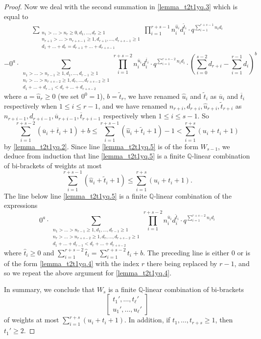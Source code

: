 \documentclass[10pt,a4paper]{amsart}
\newcommand{\Q}{ \mathbb Q }
\newcommand{\w}{\tilde}
\begin{document}
\begin{proof}
Now we deal with the second summation in \eqref{lemma_t2t1yq.3} 
which is equal to
\begin{eqnarray}  \label{lemma_t2t1yq.5}
\sum_{\substack{n_1 > \ldots > n_r \ge 0, d_1, \ldots, d_r \ge 1\\
    n_{r+1} > \ldots > n_{r+s-1} \ge 1, d_{r+1}, \ldots, d_{r+s-1} \ge 1\\
    d_1+ \ldots + d_r = d_{r+1} + \ldots + d_{r+s-1}}} 
    \prod_{i=1}^{r+s-1} n_i^{\hat u_i}d_i^{\w t_i}  
    \cdot q^{\sum_{i=1}^{r+s-1} n_i d_i}
\end{eqnarray}
$$
- 0^a \cdot 
  \sum_{\substack{n_1 > \ldots > n_{r-1} \ge 1, d_1, \ldots, d_{r-1} \ge 1\\
    n_{r} > \ldots > n_{r+s-2} \ge 1, d_{r}, \ldots, d_{r+s-2} \ge 1\\
    d_1+ \ldots + d_{r-1} < d_{r} + \ldots + d_{r+s-2}}}
    \prod_{i=1}^{r+s-2} n_i^{\overline u_i} d_i^{\overline t_i}  
    \cdot q^{\sum_{i=1}^{r+s-2} n_i d_i} \cdot  
    \left (\sum_{i=0}^{s-2} d_{r+i} - \sum_{i=1}^{r-1} d_i \right )^b
$$
where $a = \hat u_r \ge 0$ (we set $0^0 =1$), $b = \w t_r$, 
we have renamed $\hat u_i$ and $\w t_i$ as 
$\overline u_i$ and $\overline t_i$ 
respectively when $1 \le i \le r-1$, and we have renamed 
$n_{r+i}, d_{r+i}, \hat u_{r+i}, \w t_{r+i}$ as $n_{r+i-1}, d_{r+i-1}, 
\overline u_{r+i-1}, \overline t_{r+i-1}$ respectively 
when $1 \le i \le s-1$. So 
$$
    \sum_{i=1}^{r+s-2} (\overline u_i + \overline t_i + 1) + b 
\le \sum_{i=1}^{r+s-1} (\hat u_i + \w t_i + 1) - 1
< \sum_{i=1}^{r+s} (u_i + t_i + 1)
$$
by \eqref{lemma_t2t1yq.2}. Since line \eqref{lemma_t2t1yq.5} is 
of the form $W_{s-1}$, we deduce from induction that 
line \eqref{lemma_t2t1yq.5} is 
a finite $\Q$-linear combination of bi-brackets of weights at most 
$$
  \sum_{i=1}^{r+s-1} (\hat u_i + \w t_i + 1)
\le \sum_{i=1}^{r+s} (u_i + t_i + 1).
$$
The line below line \eqref{lemma_t2t1yq.5} is a finite $\Q$-linear combination of the expressions 
$$
0^a \cdot 
\sum_{\substack{n_1 > \ldots > n_{r-1} \ge 1, d_1, \ldots, d_{r-1} \ge 1\\
    n_{r} > \ldots > n_{r+s-2} \ge 1, d_{r}, \ldots, d_{r+s-2} \ge 1\\
    d_1+ \ldots + d_{r-1} < d_{r} + \ldots + d_{r+s-2}}}
    \prod_{i=1}^{r+s-2} n_i^{\overline u_i} d_i^{\hat t_i}  
    \cdot q^{\sum_{i=1}^{r+s-2} n_i d_i}
$$
where $\hat t_i \ge 0$ and $\sum_{i=1}^{r+s-2} \hat t_i 
= \sum_{i=1}^{r+s-2} t_i + b$. The preceding line is either $0$ or 
is of the form \eqref{lemma_t2t1yq.4} with the index $r$ there 
being replaced by $r-1$, and so we repeat the above argument for 
\eqref{lemma_t2t1yq.4}.

In summary, we conclude that $W_s$ is a finite $\Q$-linear combination of 
bi-brackets 
$$
\begin{bmatrix} t_1', \ldots, t_\ell'\\u_1', \ldots, u_\ell' \end{bmatrix}
$$
of weights at most $\sum_{i=1}^{r+s} (u_i + t_i+1)$. In addition, 
if $t_1, \ldots, t_{r+s} \ge 1$, then $t_1' \ge 2$. 
\end{proof}
\end{document}
